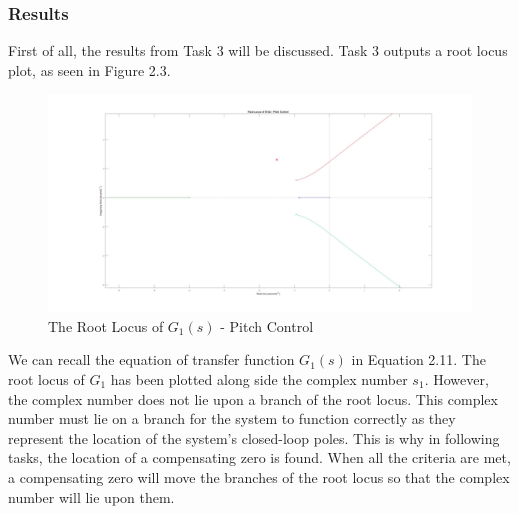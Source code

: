 \documentclass[stu, a4paper, 12pt, floatsintext]{apa7}
\numberwithin{figure}{section}
\numberwithin{table}{section}
\numberwithin{equation}{section}
\begin{document}
\subsubsection{Results}
First of all, the results from Task 3 will be discussed. Task 3 outputs a root locus plot, as seen in Figure 2.3.
\begin{figure}[H]
    \caption{The Root Locus of $G_1(s)$ - Pitch Control}
    \label{fig:task3_result}
    \centering
    \includegraphics[width=1.0\textwidth]{pictures/Auotpilot/Task3.jpg}
\end{figure}

We can recall the equation of transfer function $G_1(s)$ in Equation 2.11. The root locus of $G_1$ has been plotted along side the complex number $s_1$. However, the complex number does not lie upon a branch of the root locus. This complex number must lie on a branch for the system to function correctly as they represent the location of the system's closed-loop poles. This is why in following tasks, the location of a compensating zero is found. When all the criteria are met, a compensating zero will move the branches of the root locus so that the complex number will lie upon them. 
\end{document}
